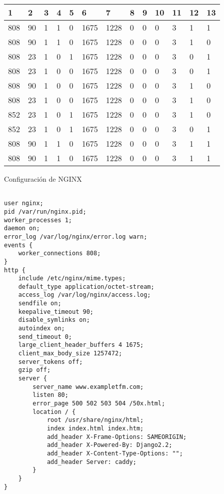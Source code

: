 \begin{table}[H]
\begin{tabular}{|l|l|l|l|l|l|l|l|l|l|l|l|l|}
\hline
\textbf{1} & \textbf{2} & \textbf{3} & \textbf{4} & \textbf{5} & \textbf{6} & \textbf{7} & \textbf{8} & \textbf{9} & \textbf{10} & \textbf{11} & \textbf{12} & \textbf{13} \\ \hline
808  &  90  &  1  &  1  &  0  &  1675  &  1228  &  0  &  0  &  0  &  3  &  1  &  1 \\ \hline
808  &  90  &  1  &  1  &  0  &  1675  &  1228  &  0  &  0  &  0  &  3  &  1  &  0 \\ \hline
808  &  23  &  1  &  0  &  1  &  1675  &  1228  &  0  &  0  &  0  &  3  &  0  &  1 \\ \hline
808  &  23  &  1  &  0  &  0  &  1675  &  1228  &  0  &  0  &  0  &  3  &  0  &  1 \\ \hline
808  &  90  &  1  &  0  &  0  &  1675  &  1228  &  0  &  0  &  0  &  3  &  1  &  0 \\ \hline
808  &  23  &  1  &  0  &  0  &  1675  &  1228  &  0  &  0  &  0  &  3  &  1  &  0 \\ \hline
852  &  23  &  1  &  0  &  1  &  1675  &  1228  &  0  &  0  &  0  &  3  &  1  &  0 \\ \hline
852  &  23  &  1  &  0  &  1  &  1675  &  1228  &  0  &  0  &  0  &  3  &  0  &  1 \\ \hline
808  &  90  &  1  &  1  &  0  &  1675  &  1228  &  0  &  0  &  0  &  3  &  1  &  1 \\ \hline
808  &  90  &  1  &  1  &  0  &  1675  &  1228  &  0  &  0  &  0  &  3  &  1  &  1 \\ \hline
\end{tabular}
\end{table}
Configuración de NGINX
\begin{lstlisting}[label={lst:nginx_config_random},caption={Configuración de NGINX tras 5 generaciones}]

user nginx;
pid /var/run/nginx.pid;
worker_processes 1;
daemon on;
error_log /var/log/nginx/error.log warn;
events {
    worker_connections 808;
}
http {
    include /etc/nginx/mime.types;
    default_type application/octet-stream;
    access_log /var/log/nginx/access.log;
    sendfile on;
    keepalive_timeout 90;
    disable_symlinks on;
    autoindex on;
    send_timeout 0;
    large_client_header_buffers 4 1675;
    client_max_body_size 1257472;
    server_tokens off;
    gzip off;
    server {
        server_name www.exampletfm.com;
        listen 80;
        error_page 500 502 503 504 /50x.html;
        location / {
            root /usr/share/nginx/html;
            index index.html index.htm;
            add_header X-Frame-Options: SAMEORIGIN;
            add_header X-Powered-By: Django2.2;
            add_header X-Content-Type-Options: "";
            add_header Server: caddy;
        }
    }
}
\end{lstlisting}

